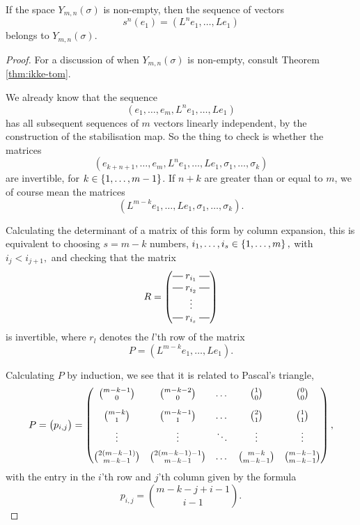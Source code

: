 \begin{theorem}
  \label{thm:eksplicit-element}
  If the space $Y_{m,n}(\sigma)$ is non-empty, then the sequence of
  vectors
  \[ s^n(e_1) = \left(L^n e_1,\dots,Le_1\right) \]
  belongs to $Y_{m,n}(\sigma)$.
\end{theorem}
\begin{proof}
  For a discussion of when $Y_{m,n}(\sigma)$ is non-empty, consult
  Theorem \ref{thm:ikke-tom}.
  
  We already know that the sequence
  \[ \left(e_1,\dots,e_m,L^n e_1,\dots, Le_1 \right) \]
  has all subsequent sequences of $m$ vectors linearly independent,
  by the construction of the stabilisation map. So the thing to check
  is whether the matrices
  \[ \left(e_{k+n+1}, \dots, e_m,L^n e_1, \dots, Le_1, \sigma_1, \dots,
    \sigma_{k}\right) \]
  are invertible, for $k \in \left\{ 1,\dots,m-1 \right\}$. If $n+k$ are greater
  than or equal to $m$, we of course mean the matrices
  \[ \left( L^{m-k}e_1,\dots,L e_1,\sigma_1,\dots,\sigma_k \right). \]
  
  Calculating the determinant of a matrix of this form by column
  expansion, this is equivalent to choosing $s=m-k$ numbers,
  $i_1,\dots,i_s \in \left\{ 1,\dots,m \right\},$ with $i_j < i_{j+1},$ and
  checking that the matrix
  \[ R = 
  \begin{pmatrix}
    \matrow{r_{i_1}} \\
    \matrow{r_{i_2}} \\
    & \hspace{-0.75em} \vdots & \\
    \matrow{r_{i_s}}
  \end{pmatrix}
  \]
  is invertible, where $r_{l}$ denotes the $l$'th row of the
  matrix
  \[ P = (L^{m-k}e_1,\dots,Le_1). \]
  
  Calculating $P$ by induction, we see that it is related to
  Pascal's triangle,
  \[ P =
  \begin{pmatrix}
    p_{i,j}
  \end{pmatrix}
  =
  \begin{pmatrix}
    {m-k-1 \choose 0}\vspace{1em} & {m-k-2\choose 0} & \dots &
    {1\choose 0} & {0 \choose 0} \\
    {m-k \choose 1} \vspace{0.5em} & {m-k-1 \choose 1} & \dots & {2
      \choose 1} & {1 \choose 1} \\
    \vdots \vspace{0.5em} & \vdots & \ddots & \vdots & \vdots\\
    {2(m-k-1) \choose {m-k-1}} & {2(m-k-1)-1 \choose m-k-1} & \dots &
    {m-k \choose m-k-1} & {m-k-1 \choose m-k-1}
  \end{pmatrix}, \]
  with the entry in the $i$'th row and $j$'th column given by the
  formula
  \[ p_{i,j} = { m-k-j+i-1 \choose i-1}. \] 
  

\end{proof}
